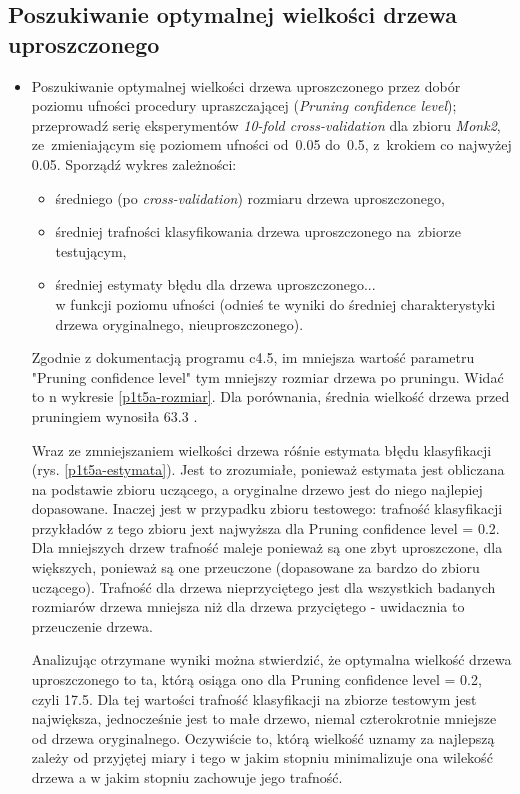 \subsection{Poszukiwanie optymalnej wielkości drzewa uproszczonego}

\begin{itemize}
\item Poszukiwanie optymalnej wielkości drzewa uproszczonego przez dobór poziomu ufności procedury upraszczającej (\emph{Pruning confidence level}); przeprowadź serię eksperymentów \emph{10-fold cross-validation} dla zbioru \emph{Monk2}, ze~zmieniającym się poziomem ufności od~0.05 do~0.5, z~krokiem co najwyżej 0.05. Sporządź wykres zależności:

\begin{itemize}
	\item średniego (po \emph{cross-validation}) rozmiaru drzewa uproszczonego,  
	\item średniej trafności klasyfikowania drzewa uproszczonego na~zbiorze testującym,
	\item średniej estymaty błędu dla drzewa uproszczonego...
	\\w funkcji poziomu ufności (odnieś te wyniki do średniej charakterystyki drzewa oryginalnego, nieuproszczonego).
\end{itemize}

Zgodnie z dokumentacją programu c4.5, im mniejsza wartość parametru "Pruning confidence level" tym mniejszy rozmiar drzewa po pruningu. Widać to n wykresie \ref{p1t5a-rozmiar}. Dla porównania, średnia wielkość drzewa przed pruningiem wynosiła $ 63.3 $ .

Wraz ze zmniejszaniem wielkości drzewa róśnie estymata błędu klasyfikacji (rys. \ref{p1t5a-estymata}). Jest to zrozumiałe, ponieważ estymata jest obliczana na podstawie zbioru uczącego, a oryginalne drzewo jest do niego najlepiej dopasowane. Inaczej jest w przypadku zbioru testowego: trafność klasyfikacji przykładów z tego zbioru jext najwyższa dla Pruning confidence level = 0.2. Dla mniejszych drzew trafność maleje ponieważ są one zbyt uproszczone, dla większych, ponieważ są one przeuczone (dopasowane za bardzo do zbioru uczącego). Trafność dla drzewa nieprzyciętego jest dla wszystkich badanych rozmiarów drzewa mniejsza niż dla drzewa przyciętego - uwidacznia to przeuczenie drzewa.

Analizując otrzymane wyniki można stwierdzić, że optymalna wielkość drzewa uproszczonego to ta, którą osiąga ono dla Pruning confidence level = 0.2, czyli 17.5. Dla tej wartości trafność klasyfikacji na zbiorze testowym jest największa, jednocześnie jest to małe drzewo, niemal czterokrotnie mniejsze od drzewa oryginalnego. Oczywiście to, którą wielkość uznamy za najlepszą zależy od przyjętej miary i tego w jakim stopniu minimalizuje ona wilekość drzewa a w jakim stopniu zachowuje jego trafność.


\end{itemize}
